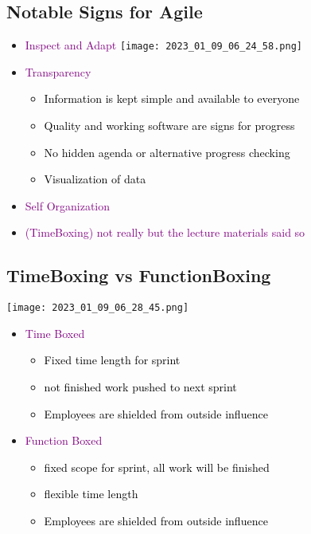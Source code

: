 \documentclass[main.tex,fontsize=12pt,paper=a4,paper=landscape,DIV=calc,]{scrartcl}
\begin{document}
\begin{multicols*}{2}
\subsection{Notable Signs for Agile}
\begin{itemize}
\item \textcolor{purple}{Inspect and Adapt}\newline
\texttt{[image: 2023\_01\_09\_06\_24\_58.png]}
\item \textcolor{purple}{Transparency}\newline
\begin{itemize}
\item \textcolor{black}{Information is kept simple and available to everyone}
\item \textcolor{black}{Quality and working software are signs for progress}
\item \textcolor{black}{No hidden agenda or alternative progress checking}
\item \textcolor{black}{Visualization of data}
\end{itemize} 
\item \textcolor{purple}{Self Organization}
\item \textcolor{purple}{(TimeBoxing) not really but the lecture materials said so}\newline
\end{itemize} 

\subsection{TimeBoxing vs FunctionBoxing}
\texttt{[image: 2023\_01\_09\_06\_28\_45.png]}\newline
\begin{itemize}
\item \textcolor{purple}{Time Boxed}\newline
\begin{itemize}
\item \textcolor{black}{Fixed time length for sprint}
\item \textcolor{black}{not finished work pushed to next sprint}
\item \textcolor{black}{Employees are shielded from outside influence}
\end{itemize} 
\item \textcolor{purple}{Function Boxed}
\begin{itemize}
\item \textcolor{black}{fixed scope for sprint, all work will be finished}
\item \textcolor{black}{flexible time length}
\item \textcolor{black}{Employees are shielded from outside influence}
\end{itemize} 
\end{itemize} 


\end{multicols*}
\end{document}
